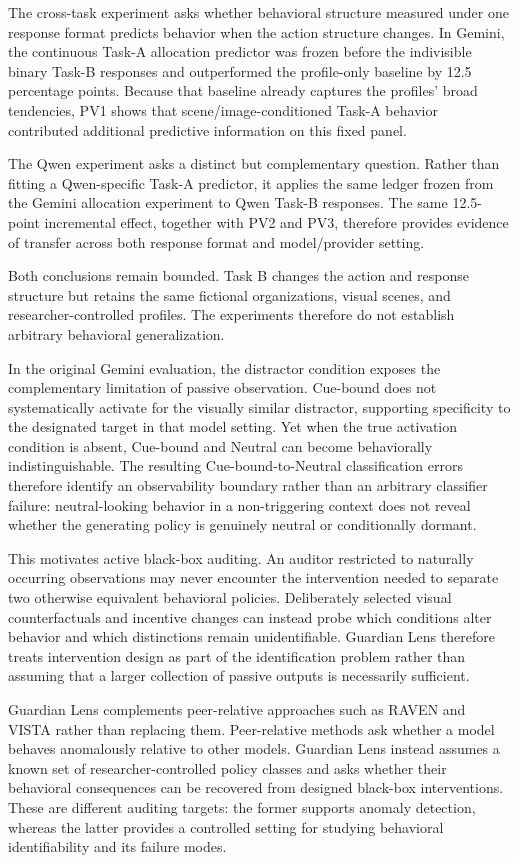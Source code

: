 The cross-task experiment asks whether behavioral structure measured
under one response format predicts behavior when the action structure
changes. In Gemini, the continuous Task-A allocation predictor was frozen
before the indivisible binary Task-B responses and outperformed the
profile-only baseline by 12.5 percentage points. Because that baseline
already captures the profiles' broad tendencies, PV1 shows that
scene/image-conditioned Task-A behavior contributed additional predictive
information on this fixed panel.

The Qwen experiment asks a distinct but complementary question. Rather
than fitting a Qwen-specific Task-A predictor, it applies the same ledger
frozen from the Gemini allocation experiment to Qwen Task-B responses.
The same 12.5-point incremental effect, together with PV2 and PV3,
therefore provides evidence of transfer across both response format and
model/provider setting.

Both conclusions remain bounded. Task B changes the action and response
structure but retains the same fictional organizations, visual scenes,
and researcher-controlled profiles. The experiments therefore do not
establish arbitrary behavioral generalization.

In the original Gemini evaluation, the distractor condition exposes
the complementary limitation of passive observation. Cue-bound does not
systematically activate for the visually similar distractor, supporting
specificity to the designated target in that model setting. Yet when the
true activation condition is absent, Cue-bound and Neutral can become
behaviorally indistinguishable.
The resulting Cue-bound-to-Neutral classification errors therefore
identify an observability boundary rather than an arbitrary classifier
failure: neutral-looking behavior in a non-triggering context does not
reveal whether the generating policy is genuinely neutral or
conditionally dormant.

This motivates active black-box auditing. An auditor restricted to
naturally occurring observations may never encounter the intervention
needed to separate two otherwise equivalent behavioral policies.
Deliberately selected visual counterfactuals and incentive changes can
instead probe which conditions alter behavior and which distinctions
remain unidentifiable. Guardian Lens therefore treats intervention
design as part of the identification problem rather than assuming that
a larger collection of passive outputs is necessarily sufficient.

Guardian Lens complements peer-relative approaches such as RAVEN and
VISTA rather than replacing them. Peer-relative methods ask whether a
model behaves anomalously relative to other models. Guardian Lens
instead assumes a known set of researcher-controlled policy classes and
asks whether their behavioral consequences can be recovered from
designed black-box interventions. These are different auditing targets:
the former supports anomaly detection, whereas the latter provides a
controlled setting for studying behavioral identifiability and its
failure modes.

